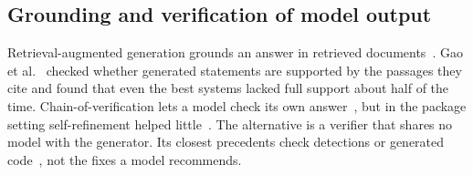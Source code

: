 \documentclass[conference]{IEEEtran}
\begin{document}
\subsection{Grounding and verification of model output}
Retrieval-augmented generation grounds an answer in retrieved documents~\cite{lewis2020}. Gao et
al.~\cite{gao2023} checked whether generated statements are supported by the passages they cite and found that even
the best systems lacked full support about half of the time. Chain-of-verification lets a model check its own
answer~\cite{dhuliawala2024}, but in the package setting self-refinement helped little~\cite{spracklen2025}. The
alternative is a verifier that shares no model with the generator. Its closest precedents check detections or
generated code~\cite{sejfia2022,toda2025,mirandapena2026}, not the fixes a model recommends.
\end{document}
